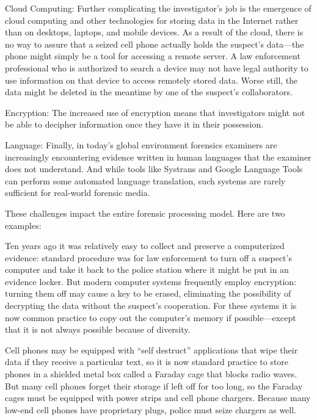 \documentclass[11pt,letter]{article}
\begin{document}
\begin{compactdesc}
\item[Cloud Computing:] Further complicating the investigator's job is
  the emergence of cloud computing and other technologies for storing
  data in the Internet rather than on desktops, laptops, and mobile
  devices. As a result of the cloud, there is no way to assure that a
  seized cell phone actually holds the suspect's data---the phone
  might simply be a tool for accessing a remote server. A law
  enforcement professional who is authorized to search a device may
  not have legal authority to use information on that device to access
  remotely stored data. Worse still, the data might be deleted in the
  meantime by one of the suspect's collaborators.

\item[Encryption:] The increased use of encryption means that
  investigators might not be able to decipher information once they
  have it in their possession. 

\item[Language:] Finally, in today's global environment forensics
  examiners are increasingly encountering evidence written in human
  languages that the examiner does not understand. And while tools
  like Systrans and Google Language Tools can perform some automated
  language translation, such systems are rarely sufficient for
  real-world forensic media.

\end{compactdesc}

These challenges impact the entire forensic processing model. Here are
two  examples:

\begin{compactitem}
\item Ten years ago it was relatively easy to collect and preserve a
computerized evidence: standard procedure was for law enforcement to
turn off a suspect's computer and take it back to the police station
where it might be put in an evidence locker. But modern computer systems
frequently employ encryption: turning them off may cause a key to be
erased, eliminating the possibility of decrypting the data without the
suspect's cooperation. For these systems it is now common practice to
copy out the computer's memory if possible---except that it is not
always possible because of diversity. 

\item Cell phones may be equipped with ``self destruct'' applications
  that wipe their data if they receive a particular text, so it is now
  standard practice to store phones in a shielded metal box called a
  Faraday cage that blocks radio waves. But many cell phones forget
  their storage if left off for too long, so the Faraday cages must be
  equipped with power strips and cell phone chargers.  Because many
  low-end cell phones have proprietary plugs, police must seize chargers as well.
\end{compactitem}
\end{document}
